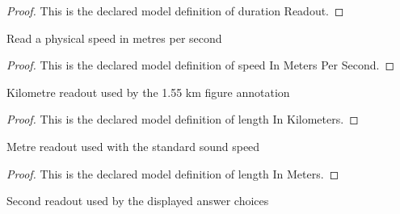 \begin{proof}
  This is the declared model definition of duration Readout.
\end{proof}
\begin{definition}
  \label{def:physics:phyx-mini-0215:phyxminiproblems-problemphyxmini0215-speedinmeterspersecond}
  Read a physical speed in metres per second
\end{definition}
\begin{proof}
  This is the declared model definition of speed In Meters Per Second.
\end{proof}
\begin{definition}
  \label{def:physics:phyx-mini-0215:phyxminiproblems-problemphyxmini0215-lengthinkilometers}
  Kilometre readout used by the 1.55 km figure annotation
\end{definition}
\begin{proof}
  This is the declared model definition of length In Kilometers.
\end{proof}
\begin{definition}
  \label{def:physics:phyx-mini-0215:phyxminiproblems-problemphyxmini0215-lengthinmeters}
  Metre readout used with the standard sound speed
\end{definition}
\begin{proof}
  This is the declared model definition of length In Meters.
\end{proof}
\begin{definition}
  \label{def:physics:phyx-mini-0215:phyxminiproblems-problemphyxmini0215-durationinseconds}
  Second readout used by the displayed answer choices
\end{definition}
